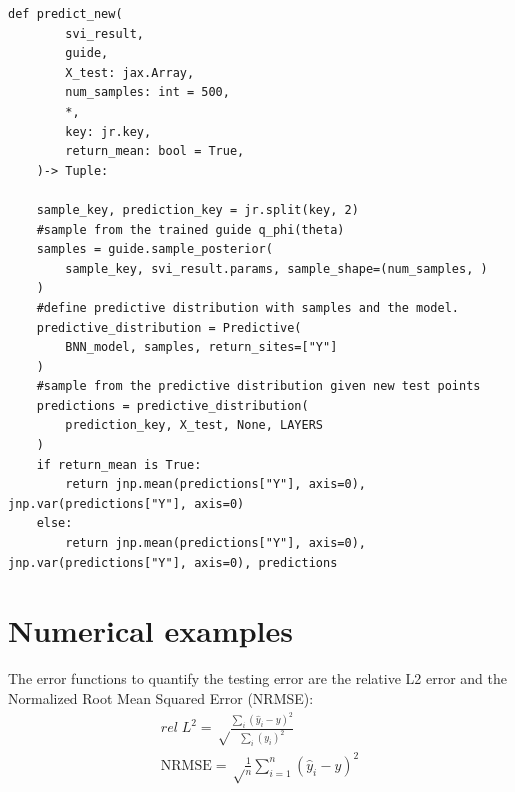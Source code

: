 \documentclass{article}
\begin{document}
\begin{lstlisting}[caption={Prediction of new samples with VI},captionpos=t]
def predict_new(
        svi_result,
        guide,
        X_test: jax.Array,
        num_samples: int = 500,
        *,
        key: jr.key,
        return_mean: bool = True,
    )-> Tuple:
    
    sample_key, prediction_key = jr.split(key, 2)
    #sample from the trained guide q_phi(theta)
    samples = guide.sample_posterior(
        sample_key, svi_result.params, sample_shape=(num_samples, )
    )
    #define predictive distribution with samples and the model.
    predictive_distribution = Predictive(
        BNN_model, samples, return_sites=["Y"]
    )
    #sample from the predictive distribution given new test points
    predictions = predictive_distribution(
        prediction_key, X_test, None, LAYERS
    )
    if return_mean is True:
        return jnp.mean(predictions["Y"], axis=0), jnp.var(predictions["Y"], axis=0)
    else:
        return jnp.mean(predictions["Y"], axis=0), jnp.var(predictions["Y"], axis=0), predictions
\end{lstlisting}
\newpage
\section{Numerical examples}
The error functions to quantify the testing error are the relative L2 error and the Normalized Root Mean Squared Error (NRMSE):
\begin{align}
     rel \; L^2 = \sqrt\frac{\sum_i (\hat{y}_i - y)^2}{\sum_i (y_i)^2}\\
    \text{NRMSE} = \sqrt \tfrac{1}{n}\sum_{i=1}^n (\hat{y}_i - y)^2
\end{align}
\end{document}
